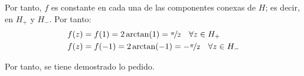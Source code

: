 \begin{ejercicio}
    Por tanto, $f$ es constante en cada una de las componentes conexas de $H$; es decir, en $H_+$ y $H_-$. Por tanto:
    \begin{align*}
        f(z) &= f(1)=2\arctan(1)=\nicefrac{\pi}{2} \quad \forall z\in H_+\\
        f(z) &= f(-1)=2\arctan(-1)=-\nicefrac{\pi}{2} \quad \forall z\in H_-
    \end{align*}

    Por tanto, se tiene demostrado lo pedido.
\end{ejercicio}